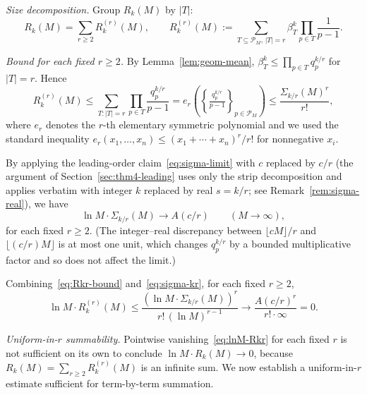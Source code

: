 \documentclass[11pt]{article}
\theoremstyle{remark}
\newcommand{\PM}{\mathcal{P}_M}
\begin{document}
\emph{Size decomposition.}
Group $R_k(M)$ by $|T|$:
\[
R_k(M) = \sum_{r \geq 2} R_k^{(r)}(M), \qquad R_k^{(r)}(M) := \sum_{T \subseteq \PM,\, |T| = r} \beta_T^k \prod_{p \in T} \frac{1}{p-1}.
\]

\emph{Bound for each fixed $r \geq 2$.}
By Lemma~\ref{lem:geom-mean}, $\beta_T^k \leq \prod_{p \in T} q_p^{k/r}$ for $|T| = r$. Hence
\begin{equation}\label{eq:Rkr-bound}
R_k^{(r)}(M) \leq \sum_{T \colon |T| = r} \prod_{p \in T} \frac{q_p^{k/r}}{p-1} = e_r\!\left(\left\{\tfrac{q_p^{k/r}}{p-1}\right\}_{p \in \PM}\right) \leq \frac{\Sigma_{k/r}(M)^r}{r!},
\end{equation}
where $e_r$ denotes the $r$-th elementary symmetric polynomial and we used the standard inequality $e_r(x_1, \ldots, x_n) \leq (x_1 + \cdots + x_n)^r / r!$ for nonnegative $x_i$.

By applying the leading-order claim~\eqref{eq:sigma-limit} with $c$ replaced by $c/r$ (the argument of Section~\ref{sec:thm4-leading} uses only the strip decomposition and applies verbatim with integer $k$ replaced by real $s = k/r$; see Remark~\ref{rem:sigma-real}), we have
\begin{equation}\label{eq:sigma-kr}
\ln M \cdot \Sigma_{k/r}(M) \longrightarrow A(c/r) \qquad (M \to \infty),
\end{equation}
for each fixed $r \geq 2$. (The integer--real discrepancy between $\lfloor cM \rfloor / r$ and $\lfloor (c/r)M \rfloor$ is at most one unit, which changes $q_p^{k/r}$ by a bounded multiplicative factor and so does not affect the limit.)

Combining~\eqref{eq:Rkr-bound} and~\eqref{eq:sigma-kr}, for each fixed $r \geq 2$,
\begin{equation}\label{eq:lnM-Rkr}
\ln M \cdot R_k^{(r)}(M) \leq \frac{(\ln M \cdot \Sigma_{k/r}(M))^r}{r!\, (\ln M)^{r-1}} \longrightarrow \frac{A(c/r)^r}{r! \cdot \infty} = 0.
\end{equation}

\emph{Uniform-in-$r$ summability.}
Pointwise vanishing~\eqref{eq:lnM-Rkr} for each fixed $r$ is not sufficient on its own to conclude $\ln M \cdot R_k(M) \to 0$, because $R_k(M) = \sum_{r \geq 2} R_k^{(r)}(M)$ is an infinite sum. We now establish a uniform-in-$r$ estimate sufficient for term-by-term summation.
\end{document}
